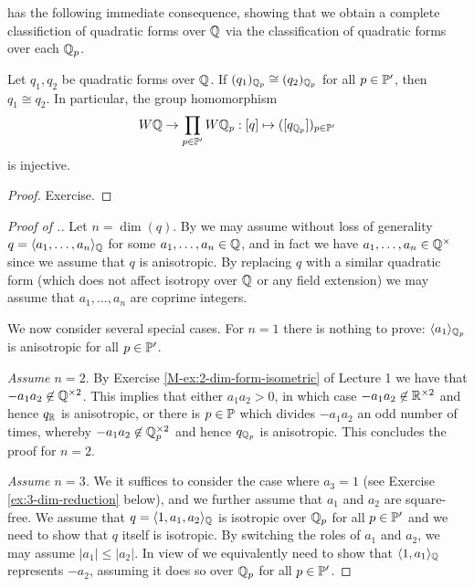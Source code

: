 \documentclass[12pt, leqno, british]{amsart}
\begin{document}
 has the following immediate consequence, showing that we obtain a complete classifiction of quadratic forms over $\mathbb Q$ via the classification of quadratic forms over each $\mathbb Q_p$.
\begin{cor}\label{C:Hasse-Minkowski}
Let $q_1, q_2$ be quadratic forms over $\mathbb Q$.
If $(q_1)_{\mathbb Q_p} \cong (q_2)_{\mathbb Q_p}$ for all $p \in \mathbb P'$, then $q_1 \cong q_2$.
In particular, the group homomorphism
$$ W\mathbb Q \to \prod_{p \in \mathbb P'} W\mathbb Q_p : [q] \mapsto ([q_{\mathbb Q_p}])_{p \in \mathbb P'}$$
is injective.
\end{cor}
\begin{proof}
Exercise.
\end{proof}
\begin{proof}[Proof of .]
Let $n = \dim(q)$.
By  we may assume without loss of generality $q = \langle a_1, \ldots, a_n \rangle_\mathbb Q$ for some $a_1, \ldots, a_n \in \mathbb Q$, and in fact we have $a_1, \ldots, a_n \in \mathbb Q^\times$ since we assume that $q$ is anisotropic.
By replacing $q$ with a similar quadratic form (which does not affect isotropy over $\mathbb Q$ or any field extension) we may assume that $a_1, \ldots, a_n$ are coprime integers.

We now consider several special cases.
For $n=1$ there is nothing to prove: $\langle a_1 \rangle_{\mathbb Q_p}$ is anisotropic for all $p \in \mathbb P'$.

\emph{Assume $n=2$}.
By Exercise \eqref{M-ex:2-dim-form-isometric} of Lecture 1 we have that $-a_1a_2 \not\in \mathbb Q^{\times 2}$.
This implies that either $a_1a_2 > 0$, in which case $-a_1a_2 \not\in \mathbb R^{\times 2}$ and hence $q_\mathbb R$ is anisotropic, or there is $p \in \mathbb P$ which divides $-a_1a_2$ an odd number of times, whereby $-a_1a_2 \not\in \mathbb Q_p^{\times 2}$ and hence $q_{\mathbb Q_p}$ is anisotropic.
This concludes the proof for $n = 2$.

\emph{Assume $n = 3$.}
We it suffices to consider the case where $a_3 = 1$ (see Exercise \eqref{ex:3-dim-reduction} below), and we further assume that $a_1$ and $a_2$ are square-free.
We assume that $q = \langle 1, a_1, a_2 \rangle_{\mathbb Q}$ is isotropic over $\mathbb Q_p$ for all $p \in \mathbb P'$ and we need to show that $q$ itself is isotropic.
By switching the roles of $a_1$ and $a_2$, we may assume $\lvert a_1 \rvert \leq \lvert a_2 \rvert$.
In view of  we equivalently need to show that $\langle 1, a_1 \rangle_{\mathbb Q}$ represents $-a_2$, assuming it does so over $\mathbb Q_p$ for all $p \in \mathbb P'$.


\end{proof}
\end{document}
